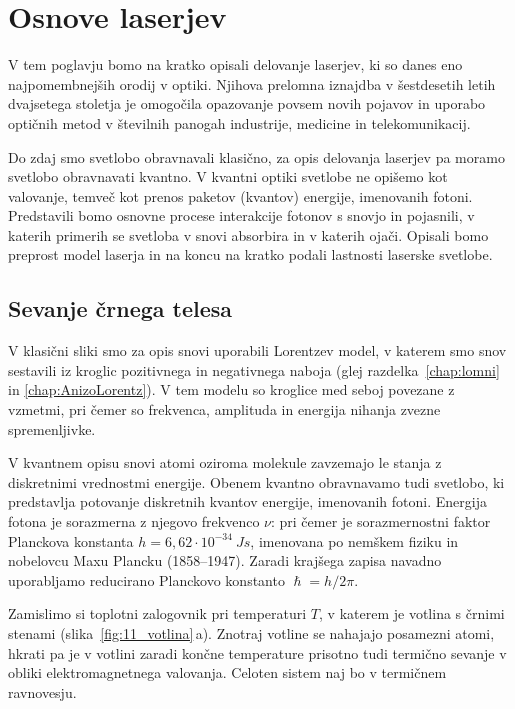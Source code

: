 
\chapter{Osnove laserjev}
V tem poglavju bomo na kratko opisali delovanje laserjev, ki so 
danes eno najpomembnejših orodij v optiki. Njihova prelomna
iznajdba v šestdesetih letih dvajsetega stoletja je omogočila
opazovanje povsem novih pojavov in uporabo optičnih metod
v številnih panogah industrije, medicine in telekomunikacij.

Do zdaj smo svetlobo obravnavali klasično, za
opis delovanja laserjev pa moramo svetlobo obravnavati kvantno. V kvantni optiki 
svetlobe ne opišemo kot valovanje, temveč kot 
prenos paketov (kvantov) energije, imenovanih fotoni.
Predstavili bomo osnovne procese interakcije 
fotonov s snovjo in pojasnili, v katerih primerih se svetloba v snovi
absorbira in v katerih ojači. Opisali bomo preprost model laserja 
in na koncu na kratko podali lastnosti laserske svetlobe.

\section{Sevanje črnega telesa}
V klasični sliki smo za opis snovi uporabili Lorentzev model, 
v katerem smo snov sestavili iz kroglic pozitivnega in 
negativnega naboja (glej razdelka~\ref{chap:lomni} in 
\ref{chap:AnizoLorentz}).
V tem modelu so kroglice med seboj povezane z vzmetmi, pri čemer so
frekvenca, amplituda in energija nihanja zvezne spremenljivke.

V kvantnem opisu snovi atomi oziroma molekule zavzemajo
le stanja z diskretnimi vrednostmi energije. Obenem kvantno
obravnavamo tudi svetlobo, ki predstavlja potovanje diskretnih
kvantov energije, imenovanih fotoni.
Energija fotona je sorazmerna z njegovo frekvenco $\nu$:
pri čemer je sorazmernostni faktor Planckova konstanta
$h = 6,62 \cdot 10^{-34}~\si{Js}$, imenovana 
po nemškem fiziku in nobelovcu Maxu Plancku (1858--1947).
Zaradi krajšega zapisa navadno uporabljamo reducirano Planckovo konstanto
$\hslash = h/2\pi$.

Zamislimo si toplotni zalogovnik pri temperaturi $T$, v katerem 
je votlina s črnimi stenami (slika~\ref{fig:11_votlina}\,a). 
Znotraj votline se nahajajo posamezni atomi, hkrati pa je v votlini zaradi 
končne temperature prisotno tudi termično sevanje v obliki 
elektromagnetnega valovanja. Celoten sistem naj bo v termičnem ravnovesju.

